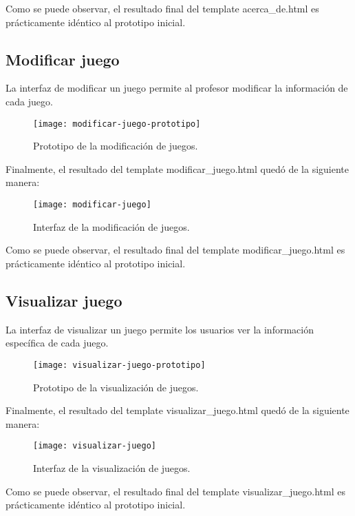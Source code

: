 Como se puede observar, el resultado final del template acerca\_de.html es prácticamente idéntico al prototipo inicial. 

\subsection{Modificar juego}
La interfaz de modificar un juego permite al profesor modificar la información de cada juego.
\begin{figure}[htb]
\centering
\texttt{[image: modificar-juego-prototipo]}
\caption{Prototipo de la modificación de juegos.}
\label{fig:modificar-juego-prototipo}
\end{figure}
Finalmente, el resultado del template modificar\_juego.html quedó de la siguiente manera:
\newpage
\begin{figure}[htb]
\centering
\texttt{[image: modificar-juego]}
\caption{Interfaz de la modificación de juegos.}
\label{fig:modificar-juego}
\end{figure}

Como se puede observar, el resultado final del template modificar\_juego.html es prácticamente idéntico al prototipo inicial. 

\subsection{Visualizar juego}
La interfaz de visualizar un juego permite los usuarios ver la información específica de cada juego.
\newpage
\begin{figure}[htb]
\centering
\texttt{[image: visualizar-juego-prototipo]}
\caption{Prototipo de la visualización de juegos.}
\label{fig:visualizar-juego-prototipo}
\end{figure}
Finalmente, el resultado del template visualizar\_juego.html quedó de la siguiente manera:
\newpage
\begin{figure}[htb]
\centering
\texttt{[image: visualizar-juego]}
\caption{Interfaz de la visualización de juegos.}
\label{fig:visualizar-juego}
\end{figure}

Como se puede observar, el resultado final del template visualizar\_juego.html es prácticamente idéntico al prototipo inicial. 
